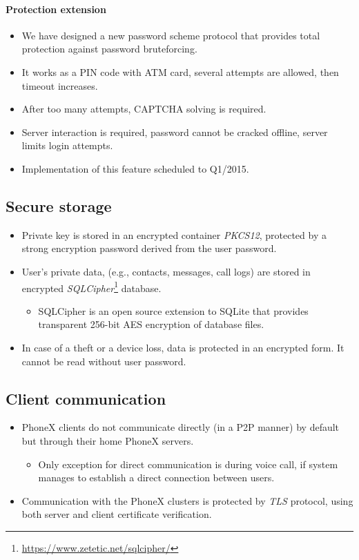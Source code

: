 \documentclass[a4paper,10pt]{article}
\begin{document}
\paragraph{Protection extension}
\begin{itemize}
 \item We have designed a new password scheme protocol that provides total protection against password bruteforcing.
 \item It works as a PIN code with ATM card, several attempts are allowed, then timeout increases. 
 \item After too many attempts, CAPTCHA solving is required.
 \item Server interaction is required, password cannot be cracked offline, server limits login attempts.
 \item Implementation of this feature scheduled to Q1/2015.
\end{itemize}

\subsection{Secure storage}
\begin{itemize}
 \item Private key is stored in an encrypted container \emph{PKCS12}, protected by a strong encryption password derived from the user password.
 \item User's private data, (e.g., contacts, messages, call logs) are stored in encrypted \emph{SQLCipher}\footnote{\url{https://www.zetetic.net/sqlcipher/}} database.
\begin{itemize}
 \item SQLCipher is an open source extension to SQLite that provides transparent 256-bit AES encryption of database files.
\end{itemize}
 \item In case of a theft or a device loss, data is protected in an encrypted form. It cannot be read without user password.
\end{itemize}

\subsection{Client communication}
\begin{itemize}
 \item PhoneX clients do not communicate directly (in a P2P manner) by default but through their home PhoneX servers.
\begin{itemize}
 \item Only exception for direct communication is during voice call, if system manages to establish a direct connection between users.
\end{itemize}
 \item Communication with the PhoneX clusters is protected by \emph{TLS} protocol, using both server and client certificate verification. 
\end{itemize}
\end{document}
